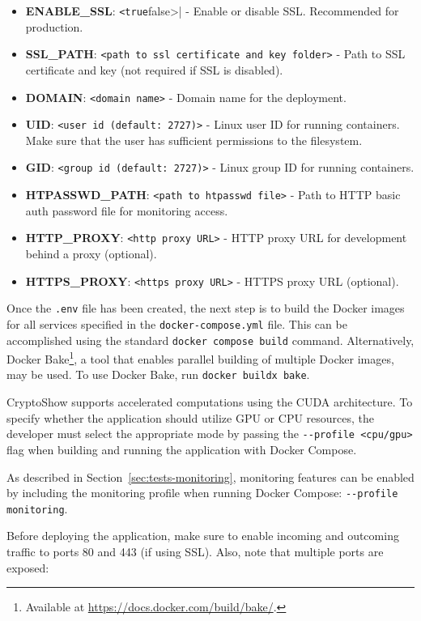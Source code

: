 \begin{itemize}
    \item \textbf{ENABLE\_SSL}: \lstinline|<true|false>| - Enable or disable SSL. Recommended for production.
        \item \textbf{SSL\_PATH}: \lstinline|<path to ssl certificate and key folder>| - Path to SSL certificate and key (not required if SSL is disabled).
        \item \textbf{DOMAIN}: \lstinline|<domain name>| - Domain name for the deployment.
        \item \textbf{UID}: \lstinline|<user id (default: 2727)>| - Linux user ID for running containers. Make sure that the user has sufficient permissions to the filesystem.
        \item \textbf{GID}: \lstinline|<group id (default: 2727)>| - Linux group ID for running containers.
        \item \textbf{HTPASSWD\_PATH}: \lstinline|<path to htpasswd file>| - Path to HTTP basic auth password file for monitoring access.
        \item \textbf{HTTP\_PROXY}: \lstinline|<http proxy URL>| - HTTP proxy URL for development behind a proxy (optional).
        \item \textbf{HTTPS\_PROXY}: \lstinline|<https proxy URL>| - HTTPS proxy URL (optional).
\end{itemize}

Once the \lstinline|.env| file has been created, the next step is to build the Docker images for all services specified in the \lstinline!docker-compose.yml! file. This can be accomplished using the standard \lstinline|docker compose build| command. Alternatively, Docker Bake\footnote{Available at \url{https://docs.docker.com/build/bake/}.}, a tool that enables parallel building of multiple Docker images, may be used. To use Docker Bake, run \lstinline|docker buildx bake|.

CryptoShow supports accelerated computations using the CUDA architecture. To specify whether the application should utilize GPU or CPU resources, the developer must select the appropriate mode by passing the \lstinline|--profile <cpu/gpu>| flag when building and running the application with Docker Compose.

As described in Section~\ref{sec:tests-monitoring}, monitoring features can be enabled by including the monitoring profile when running Docker Compose: \lstinline|--profile monitoring|.

Before deploying the application, make sure to enable incoming and outcoming traffic to ports 80 and 443 (if using SSL). Also, note that multiple ports are exposed:

